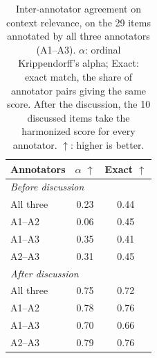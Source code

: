 \begin{table}[t]
\centering
\small
\caption{Inter-annotator agreement on context relevance, on the 29 items annotated by all three annotators (A1--A3). $\alpha$: ordinal Krippendorff's alpha; Exact: exact match, the share of annotator pairs giving the same score. After the discussion, the 10 discussed items take the harmonized score for every annotator. $\uparrow$: higher is better.}
\label{tab:context-relevance-agreement}
\begin{tabular}{lcc}
\toprule
\textbf{Annotators} & \textbf{$\alpha$} $\uparrow$ & \textbf{Exact} $\uparrow$ \\
\midrule
\multicolumn{3}{l}{\textit{Before discussion}} \\
All three & 0.23 & 0.44 \\
A1--A2 & 0.06 & 0.45 \\
A1--A3 & 0.35 & 0.41 \\
A2--A3 & 0.31 & 0.45 \\
\midrule
\multicolumn{3}{l}{\textit{After discussion}} \\
All three & 0.75 & 0.72 \\
A1--A2 & 0.78 & 0.76 \\
A1--A3 & 0.70 & 0.66 \\
A2--A3 & 0.79 & 0.76 \\
\bottomrule
\end{tabular}
\end{table}
